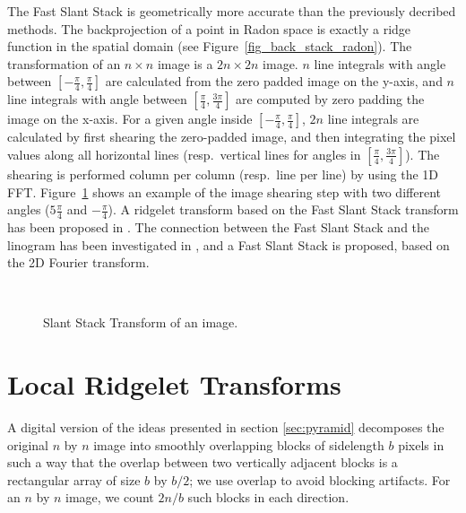 The Fast Slant Stack \cite{cur:averbuch01}
 is geometrically more accurate than the 
previously decribed methods. The backprojection of a point 
in Radon space is exactly a ridge function in the spatial domain
(see Figure~\ref{fig_back_stack_radon}).
The transformation of an $n \times n$ image is a $2n \times 2n$ image.
$n$ line integrals with angle between $[-\frac{\pi}{4}, \frac{\pi}{4}]$
are calculated from the zero padded image on the y-axis, 
and $n$ line integrals with angle between $[\frac{\pi}{4}, \frac{3\pi}{4}]$
are computed by zero padding the image on the x-axis. 
For a given angle inside $[-\frac{\pi}{4}, \frac{\pi}{4}]$,
$2n$ line integrals are calculated by first shearing the zero-padded image, 
and then integrating the pixel values 
along all horizontal lines (resp.\ vertical lines
for angles in $[\frac{\pi}{4}, \frac{3\pi}{4}]$). The shearing is 
performed column per column (resp.\ line per line) by using the 1D FFT.
Figure~\ref{fig_stack_radon} shows an example of the image shearing step
with two different angles ($5\frac{\pi}{4}$  and $-\frac{\pi}{4}$).
A ridgelet transform based on the Fast Slant Stack transform has been
proposed in \cite{cur:donoho_02}. The connection between the Fast Slant Stack
and the linogram has been investigated in \cite{cur:averbuch01}, and
a Fast Slant Stack is proposed, based on the 2D Fourier transform.

\begin{figure}[htb]
\centerline{
\hbox{
}}
\caption{Slant Stack Transform of an image.}
\label{fig_stack_radon}
\end{figure}

\section{Local Ridgelet Transforms}

A digital version of the ideas presented in section \ref{sec:pyramid}
decomposes the original $n$ by $n$ image into smoothly overlapping
blocks of sidelength $b$ pixels in such a way that the overlap between
two vertically adjacent blocks is a rectangular array of size $b$ by
$b/2$; we use overlap to avoid blocking artifacts. For an $n$ by $n$
image, we count $2n/b$ such blocks in each direction.

